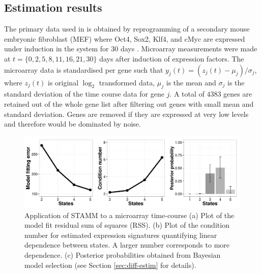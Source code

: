 \subsection{Estimation results}
\label{sec:estimation-results}

The primary data used in \cite{Armond:2013} is obtained by reprogramming of a secondary mouse embryonic fibroblast (MEF) where Oct4, Sox2, Klf4, and cMyc are expressed under induction in the system for 30 days \citep{SamavarchiTehrani:2010cp}. Microarray measurements were made at $t = \lbrace 0, 2, 5, 8, 11, 16, 21, 30 \rbrace$ days after induction of expression factors. The microarray data is standardised per gene such that $y_j(t) = \left(z_j(t) - \mu_j \right) / \sigma_j$, where $z_j(t)$ is original $\log_2$ transformed data, $\mu_j$ is the mean and $\sigma_j$ is the standard deviation of the time course data for gene $j$. A total of $4383$ genes are retained out of the whole gene list after filtering out genes with small mean and standard deviation. Genes are removed if they are expressed at very low levels and therefore would be dominated by noise. 

\begin{figure}[!t]
  \centering
  \includegraphics[width=1\textwidth]{pics/rss_rcond_bay1.pdf}
  \caption{Application of STAMM to a microarray time-course (a) Plot of the model fit residual sum of squares (RSS). (b) Plot of the condition number for estimated expression signatures quantifying linear dependence between states. A larger number corresponds to more dependence. (c) Posterior probabilities obtained from Bayesian model selection (see Section \ref{sec:diff-estim} for details).}
  \label{fig:model-fit-repro}
\end{figure}

